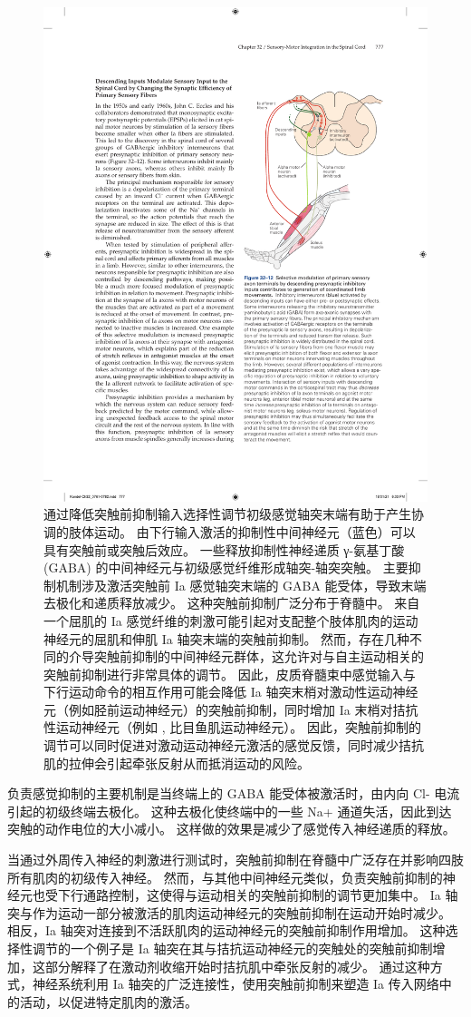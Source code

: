 \begin{figure}[htbp]
	\centering
	\includegraphics[width=0.5\linewidth]{chap32/fig_32_12}
	\caption{通过降低突触前抑制输入选择性调节初级感觉轴突末端有助于产生协调的肢体运动。 由下行输入激活的抑制性中间神经元（蓝色）可以具有突触前或突触后效应。 一些释放抑制性神经递质 γ-氨基丁酸 (GABA) 的中间神经元与初级感觉纤维形成轴突-轴突突触。 主要抑制机制涉及激活突触前 Ia 感觉轴突末端的 GABA 能受体，导致末端去极化和递质释放减少。 这种突触前抑制广泛分布于脊髓中。 来自一个屈肌的 Ia 感觉纤维的刺激可能引起对支配整个肢体肌肉的运动神经元的屈肌和伸肌 Ia 轴突末端的突触前抑制。 然而，存在几种不同的介导突触前抑制的中间神经元群体，这允许对与自主运动相关的突触前抑制进行非常具体的调节。 因此，皮质脊髓束中感觉输入与下行运动命令的相互作用可能会降低 Ia 轴突末梢对激动性运动神经元（例如胫前运动神经元）的突触前抑制，同时增加 Ia 末梢对拮抗性运动神经元（例如 , 比目鱼肌运动神经元）。 因此，突触前抑制的调节可以同时促进对激动运动神经元激活的感觉反馈，同时减少拮抗肌的拉伸会引起牵张反射从而抵消运动的风险。}
	\label{fig:32_12}
\end{figure}


负责感觉抑制的主要机制是当终端上的 GABA 能受体被激活时，由内向 Cl- 电流引起的初级终端去极化。
这种去极化使终端中的一些 Na+ 通道失活，因此到达突触的动作电位的大小减小。
这样做的效果是减少了感觉传入神经递质的释放。


当通过外周传入神经的刺激进行测试时，突触前抑制在脊髓中广泛存在并影响四肢所有肌肉的初级传入神经。
然而，与其他中间神经元类似，负责突触前抑制的神经元也受下行通路控制，这使得与运动相关的突触前抑制的调节更加集中。
Ia 轴突与作为运动一部分被激活的肌肉运动神经元的突触前抑制在运动开始时减少。
相反，Ia 轴突对连接到不活跃肌肉的运动神经元的突触前抑制作用增加。
这种选择性调节的一个例子是 Ia 轴突在其与拮抗运动神经元的突触处的突触前抑制增加，这部分解释了在激动剂收缩开始时拮抗肌中牵张反射的减少。
通过这种方式，神经系统利用 Ia 轴突的广泛连接性，使用突触前抑制来塑造 Ia 传入网络中的活动，以促进特定肌肉的激活。


